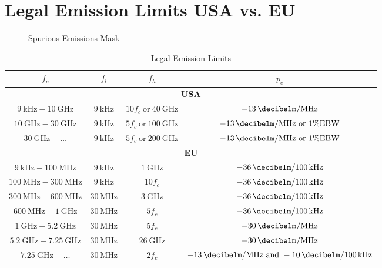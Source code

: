 \section{Legal Emission Limits USA vs. EU}
\label{sec:legem}


\begin{figure}[h]
\centering
\def\svgwidth{0.8\textwidth}

\caption{Spurious Emissions Mask}
\label{fig:sem}
\end{figure}

\cite{ceptercrec}\cite{ansi} \cite{fcc}

\begin{table}[h]
\centering
\caption{Legal Emission Limits}
\label{tab:legusa}
\begin{tabular}{|c|c|c|c|}
\hline
$f_c$  &  $f_l$ & $f_h$ & $p_e$ \\\hline
\multicolumn{4}{|c|}{\textbf{USA}} \\\hline
$\SI{9}{\kilo\hertz}-\SI{10}{\giga\hertz}$ & $\SI{9}{\kilo\hertz}$ & $10f_c\ \text{or}\ \SI{40}{\giga\hertz}$ & $\SI{-13}{\decibelm\per\mega\hertz}$ \\\hline
$\SI{10}{\giga\hertz}-\SI{30}{\giga\hertz}$ & $\SI{9}{\kilo\hertz}$ & $5f_c\ \text{or}\ \SI{100}{\giga\hertz}$ & $\SI{-13}{\decibelm\per\mega\hertz}\ \text{or}\ 1\% \text{EBW}$ \\\hline
$\SI{30}{\giga\hertz}-\dots$ & $\SI{9}{\kilo\hertz}$ & $5f_c\ \text{or}\ \SI{200}{\giga\hertz}$ & $\SI{-13}{\decibelm\per\mega\hertz}\ \text{or}\ 1\% \text{EBW}$ \\\hline
\multicolumn{4}{|c|}{\textbf{EU}} \\\hline
$\SI{9}{\kilo\hertz}-\SI{100}{\mega\hertz}$ & $\SI{9}{\kilo\hertz}$ & $\SI{1}{\giga\hertz}$ & $\SI{-36}{\decibelm\per \SI{100}{\kilo\hertz}}$ \\\hline
$\SI{100}{\mega\hertz}-\SI{300}{\mega\hertz}$ & $\SI{9}{\kilo\hertz}$ & $10f_c$ & $\SI{-36}{\decibelm\per \SI{100}{\kilo\hertz}}$ \\\hline
$\SI{300}{\mega\hertz}-\SI{600}{\mega\hertz}$ & $\SI{30}{\mega\hertz}$ & $\SI{3}{\giga\hertz}$ & $\SI{-36}{\decibelm\per \SI{100}{\kilo\hertz}}$ \\\hline
$\SI{600}{\mega\hertz}-\SI{1}{\giga\hertz}$ & $\SI{30}{\mega\hertz}$ & $5f_c$ & $\SI{-36}{\decibelm\per \SI{100}{\kilo\hertz}}$ \\\hline
$\SI{1}{\giga\hertz}-\SI{5.2}{\giga\hertz}$ & $\SI{30}{\mega\hertz}$ & $5f_c$ & $\SI{-30}{\decibelm\per\mega\hertz}$ \\\hline
$\SI{5.2}{\giga\hertz}-\SI{7.25}{\giga\hertz}$ & $\SI{30}{\mega\hertz}$ & $\SI{26}{\giga\hertz}$ & $\SI{-30}{\decibelm\per\mega\hertz}$ \\\hline
$\SI{7.25}{\giga\hertz}-\dots$ & $\SI{30}{\mega\hertz}$ & $2f_c$ & $\SI{-13}{\decibelm\per\mega\hertz}\ \text{and}\ \SI{-10}{\decibelm\per \SI{100}{\kilo\hertz}}$ \\\hline
\end{tabular}
\end{table}









